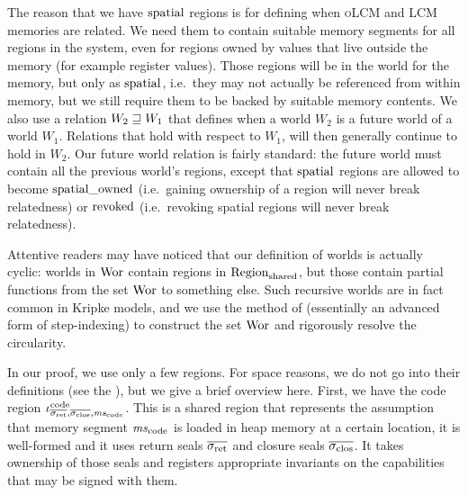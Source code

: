 \documentclass[acmsmall,review,showframe]{acmart}\settopmatter{printfolios=true,printccs=false,printacmref=false}
\renewcommand{\Worlds}{\World_{\mathrm{call\_stack}}}
\renewcommand{\Worldfs}{\World_{\mathrm{free\_stack}}}
\renewcommand{\codereg}[2][\mathrm{code}]{\iota^{#1}_{#2}}
\newcommand{\trgcm}{\textsc{LCM}}
\newcommand{\srccm}{\textsc{oLCM}}
\begin{document}
The reason that we have $\mathrm{spatial}$ regions is for defining when \srccm{} and \trgcm{} memories are related.
We need them to contain suitable memory segments for all regions in the system, even for regions owned by values that live outside the memory (for example register values).
Those regions will be in the world for the memory, but only as $\mathrm{spatial}$, i.e.\ they may not actually be referenced from within memory, but we still require them to be backed by suitable memory contents.
We also use a relation $W_2 \sqsupseteq W_1$ that defines when a world $W_2$ is a future world of a world $W_1$.
Relations that hold with respect to $W_1$, will then generally continue to hold in $W_2$.
Our future world relation is fairly standard: the future world must contain all the previous world's regions, except that $\mathrm{spatial}$ regions are allowed to become $\mathrm{spatial\_owned}$ (i.e.\ gaining ownership of a region will never break relatedness) or $\mathrm{revoked}$ (i.e.\ revoking spatial regions will never break relatedness).

Attentive readers may have noticed that our definition of worlds is actually cyclic: worlds in $\mathrm{Wor}$ contain regions in $\mathrm{Region}_\mathrm{shared}$, but those contain partial functions from the set $\mathrm{Wor}$ to something else.
Such recursive worlds are in fact common in Kripke models, and we use the method of \citet{Birkedal:2011:SKM:1926385.1926401,Birkedal_taste_2014} (essentially an advanced form of step-indexing) to construct the set $\mathrm{Wor}$ and rigorously resolve the circularity.

In our proof, we use only a few regions.
For space reasons, we do not go into their definitions (see the \citet{technical_report}), but we give a brief overview here.
First, we have the code region $\codereg{\sigrets,\sigcloss,\mscode}$.
This is a shared region that represents the assumption that memory segment
$\mscode$ is loaded in heap memory at a certain location, it is well-formed and it uses return seals $\sigrets$ and closure seals $\sigcloss$.
It takes ownership of those seals and registers appropriate invariants on the capabilities that may be signed with them.
\end{document}

